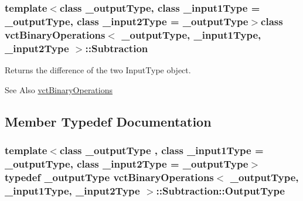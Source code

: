 \subsubsection*{template$<$class \-\_\-output\-Type, class \-\_\-input1\-Type = \-\_\-output\-Type, class \-\_\-input2\-Type = \-\_\-output\-Type$>$class vct\-Binary\-Operations$<$ \-\_\-output\-Type, \-\_\-input1\-Type, \-\_\-input2\-Type $>$\-::\-Subtraction}

Returns the difference of the two Input\-Type object. 

\begin{DoxySeeAlso}{See Also}
\hyperlink{classvct_binary_operations}{vct\-Binary\-Operations} 
\end{DoxySeeAlso}


\subsection{Member Typedef Documentation}
\hypertarget{classvct_binary_operations_1_1_subtraction_acdf0aa04f6b08e9b6d199035f89071ff}{
\subsubsection[{Output\-Type}]{\setlength{\rightskip}{0pt plus 5cm}template$<$class \-\_\-output\-Type , class \-\_\-input1\-Type  = \-\_\-output\-Type, class \-\_\-input2\-Type  = \-\_\-output\-Type$>$ typedef \-\_\-output\-Type {\bf vct\-Binary\-Operations}$<$ \-\_\-output\-Type, \-\_\-input1\-Type, \-\_\-input2\-Type $>$\-::{\bf Subtraction\-::\-Output\-Type}}}\label{classvct_binary_operations_1_1_subtraction_acdf0aa04f6b08e9b6d199035f89071ff}



